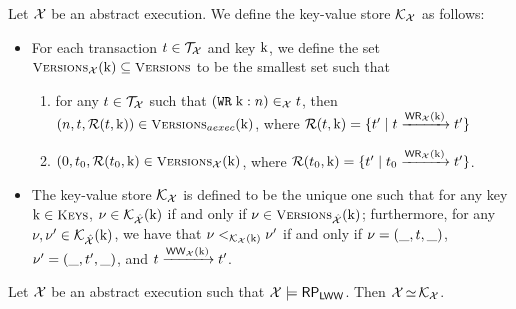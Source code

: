 \begin{definition}
Let $\mathcal{X}$ be an abstract execution. 
We define the key-value store $\mathcal{K}_{\mathcal{X}}$ as follows: 
\begin{itemize}
\item For each transaction $t \in \mathcal{T}_{\mathcal{X}}$ and key $\mathrm{k}$, 
we define the set $\Versions_{\aexec}(\key{k}) \subseteq \Versions$ to be the smallest set such that 
\begin{enumerate}
\item for any $t \in \mathcal{T}_{\mathcal{X}}$ such that $({{\tt WR}}\;\mathrm{k}: n) \in_{\mathcal{X}} t$,
then
$(n, \tsid, \mathcal{R}(\tsid, \key{k})) \in \Versions_{aexec}(\key{k})$, 
where $\mathcal{R}(t, \mathrm{k}) = \{t' \mid t \xrightarrow{{\mathsf{WR}}_{\mathcal{X}}(\mathrm{k})} t'\}$ 
\item $(0, \tsid_0, \mathcal{R}(\tsid_{0}, \key{k}) \in \Versions_{\aexec}(\key{k})$, 
where $\mathcal{R}(t_{0}, \mathrm{k}) = \{t' \mid t_0 \xrightarrow{{\mathsf{WR}}_{\mathcal{X}}(\mathrm{k})} t'\}$.
\end{enumerate}
\item The key-value store $\mathcal{K}_{\mathcal{X}}$ is defined to be the unique one such that 
for any key $\key{k} \in \Addr$, $\nu \in \mathcal{K}_{\hat{\mathcal{X}}}(\mathrm{k})$ if and only if 
$\nu \in \Versions_{\hat{\aexec}}(\key{k})$; furthermore, for any $\nu, \nu' \in \mathcal{K}_{\hat{\mathcal{X}}}(\mathrm{k})$, 
we have that $\nu <_{\mathcal{K}_{\mathcal{X}}(\mathrm{k})} \nu'$ if and only if $\nu = (\_, t, \_)$, 
$\nu' = (\_, t', \_)$, and $t \xrightarrow{{\mathsf{WW}}_{\mathcal{X}}(\mathrm{k})} t'$.
\end{itemize}
\end{definition}

\begin{proposition}
Let $\mathcal{X}$ be an abstract execution such that $\mathcal{X} \models \mathsf{RP}_{\mathsf{LWW}}$. 
Then $\mathcal{X} \mathop{\simeq} \mathcal{K}_{\mathcal{X}}$. 
\end{proposition}

